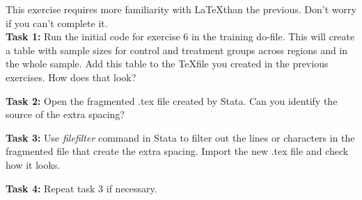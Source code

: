 \documentclass[12pts]{report}
\begin{document}
This exercise requires more familiarity with \LaTeX than the previous. Don't worry if you can't complete it. \\

\textbf{Task 1:} Run the initial code for exercise 6 in the training do-file. This will create a table with sample sizes for control and treatment groups across regions and in the whole sample. Add this table to the \TeX\space file you created in the previous exercises. How does that look?

\textbf{Task 2:} Open the fragmented .tex file created by Stata. Can you identify the source of the extra spacing?

\textbf{Task 3:} Use \textit{filefilter} command in Stata to filter out the lines or characters in the fragmented file that create the extra spacing. Import the new .tex file and check how it looks.

\textbf{Task 4:} Repeat task 3 if necessary.
\end{document}
